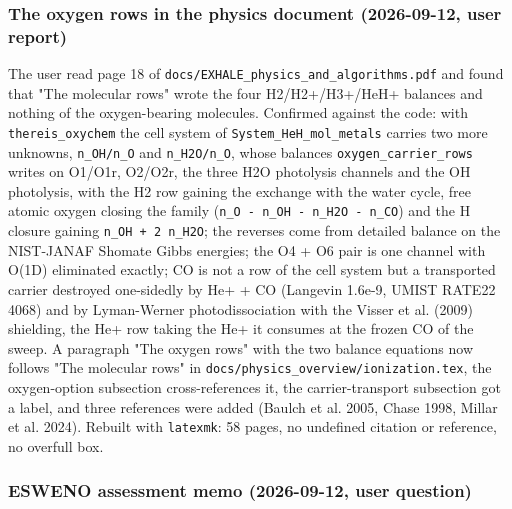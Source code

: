 \documentclass[english,a4paper]{my_memo}
\begin{document}
\subsubsection{The oxygen rows in the physics document (2026-09-12, user report)}\label{the-oxygen-rows-in-the-physics-document-2026-09-12-user-report}

The user read page 18 of \texttt{docs/EXHALE\_physics\_and\_algorithms.pdf} and found
that "The molecular rows" wrote the four H2/H2+/H3+/HeH+ balances and nothing
of the oxygen-bearing molecules. Confirmed against the code: with
\texttt{thereis\_oxychem} the cell system of \texttt{System\_HeH\_mol\_metals} carries two more
unknowns, \texttt{n\_OH/n\_O} and \texttt{n\_H2O/n\_O}, whose balances \texttt{oxygen\_carrier\_rows}
writes on O1/O1r, O2/O2r, the three H2O photolysis channels and the OH
photolysis, with the H2 row gaining the exchange with the water cycle, free
atomic oxygen closing the family (\texttt{n\_O\ -\ n\_OH\ -\ n\_H2O\ -\ n\_CO}) and the H
closure gaining \texttt{n\_OH\ +\ 2\ n\_H2O}; the reverses come from detailed balance on
the NIST-JANAF Shomate Gibbs energies; the O4 + O6 pair is one channel with
O(1D) eliminated exactly; CO is not a row of the cell system but a
transported carrier destroyed one-sidedly by He+ + CO (Langevin 1.6e-9,
UMIST RATE22 4068) and by Lyman-Werner photodissociation with the Visser et
al. (2009) shielding, the He+ row taking the He+ it consumes at the frozen
CO of the sweep. A paragraph "The oxygen rows" with the two balance equations
now follows "The molecular rows" in \texttt{docs/physics\_overview/ionization.tex},
the oxygen-option subsection cross-references it, the carrier-transport
subsection got a label, and three references were added (Baulch et al.
2005, Chase 1998, Millar et al. 2024). Rebuilt with \texttt{latexmk}: 58 pages, no
undefined citation or reference, no overfull box.

\subsubsection{ESWENO assessment memo (2026-09-12, user question)}\label{esweno-assessment-memo-2026-09-12-user-question}
\end{document}
